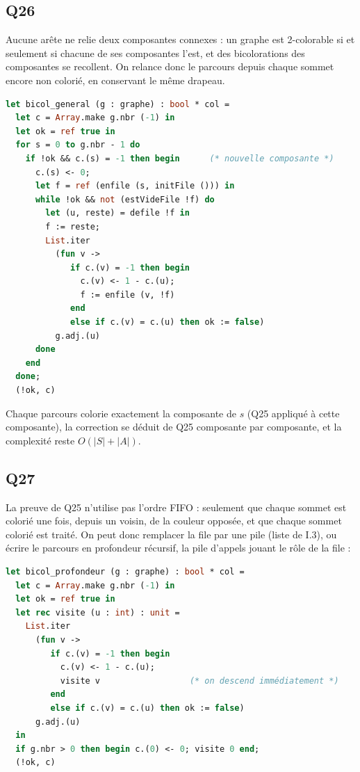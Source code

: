 \documentclass[11pt,a4paper]{article}
\begin{document}
\hypertarget{q26}{%
\subsection{Q26}\label{q26}}

Aucune arête ne relie deux composantes connexes : un graphe est 2-colorable si et seulement si chacune de ses composantes l'est, et des bicolorations des composantes se recollent. On relance donc le parcours depuis chaque sommet encore non colorié, en conservant le même drapeau.

\begin{lstlisting}[language=Caml]
let bicol_general (g : graphe) : bool * col =
  let c = Array.make g.nbr (-1) in
  let ok = ref true in
  for s = 0 to g.nbr - 1 do
    if !ok && c.(s) = -1 then begin      (* nouvelle composante *)
      c.(s) <- 0;
      let f = ref (enfile (s, initFile ())) in
      while !ok && not (estVideFile !f) do
        let (u, reste) = defile !f in
        f := reste;
        List.iter
          (fun v ->
             if c.(v) = -1 then begin
               c.(v) <- 1 - c.(u);
               f := enfile (v, !f)
             end
             else if c.(v) = c.(u) then ok := false)
          g.adj.(u)
      done
    end
  done;
  (!ok, c)
\end{lstlisting}

Chaque parcours colorie exactement la composante de \(s\) (Q25 appliqué à cette composante), la correction se déduit de Q25 composante par composante, et la complexité reste \(O(|S| + |A|)\).

\hypertarget{q27}{%
\subsection{Q27}\label{q27}}

La preuve de Q25 n'utilise pas l'ordre FIFO : seulement que chaque sommet est colorié une fois, depuis un voisin, de la couleur opposée, et que chaque sommet colorié est traité. On peut donc remplacer la file par une pile (liste de I.3), ou écrire le parcours en profondeur récursif, la pile d'appels jouant le rôle de la file :

\begin{lstlisting}[language=Caml]
let bicol_profondeur (g : graphe) : bool * col =
  let c = Array.make g.nbr (-1) in
  let ok = ref true in
  let rec visite (u : int) : unit =
    List.iter
      (fun v ->
         if c.(v) = -1 then begin
           c.(v) <- 1 - c.(u);
           visite v                  (* on descend immédiatement *)
         end
         else if c.(v) = c.(u) then ok := false)
      g.adj.(u)
  in
  if g.nbr > 0 then begin c.(0) <- 0; visite 0 end;
  (!ok, c)
\end{lstlisting}
\end{document}
